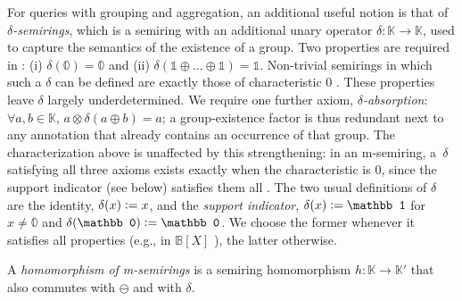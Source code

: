 For queries with grouping and aggregation, an additional useful notion
\cite{amsterdamer2011provenance} is that of \emph{$\delta$-semirings},
which is a semiring with an additional unary operator $\delta:\mathbb
K\to \mathbb K$, used to capture the semantics of the existence of a
group. Two properties are required in \cite{amsterdamer2011provenance}:
(i) $\delta(\mathbb
0)=\mathbb 0$ and (ii) $\delta(\mathbb 1 \oplus \dots \oplus \mathbb
1)=\mathbb 1$. Non-trivial semirings in which such a $\delta$ can be defined are exactly
those of characteristic $0$
.
These properties leave $\delta$ largely underdetermined. We require one
further axiom, \emph{$\delta$-absorption}: $\forall a,b\in\mathbb K$,
$a\otimes\delta(a\oplus b)=a$; a group-existence factor is thus redundant
next to any annotation that already contains an occurrence of that group.
The characterization above is unaffected by this strengthening: in an
m-semiring, a~$\delta$ satisfying all three axioms exists exactly when the
characteristic is $0$, since the support indicator (see below) satisfies
them all .
The two usual definitions of $\delta$ are the identity,
$\delta(x)\mathrel{\mathop:}= x$, and the \emph{support indicator},
$\delta(x)\defeq\mathbb 1$ for $x\neq\mathbb 0$ and
$\delta(\mathbb 0)\defeq\mathbb 0$. We choose the former whenever it
satisfies all properties (e.g., in $\mathbb{B}[X]$
), the latter otherwise.

A \emph{homomorphism of m-semirings}
 is a semiring
homomorphism $h:\mathbb K\to\mathbb K'$ that also commutes with
$\ominus$ and with $\delta$.

